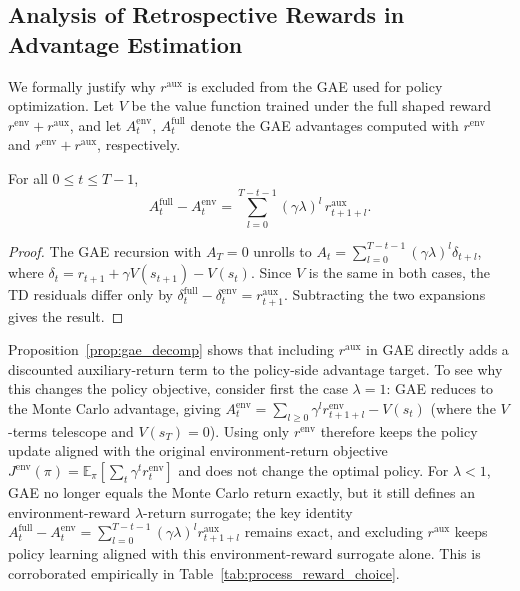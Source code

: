 \subsection{Analysis of Retrospective Rewards in Advantage Estimation}
\label{app:gae_analysis}

We formally justify why $r^{\text{aux}}$ is excluded from the GAE used for policy optimization. Let $V$ be the value function trained under the full shaped reward $r^{\text{env}} + r^{\text{aux}}$, and let $A_t^{\text{env}}$, $A_t^{\text{full}}$ denote the GAE advantages computed with $r^{\text{env}}$ and $r^{\text{env}} + r^{\text{aux}}$, respectively.

\begin{proposition}
\label{prop:gae_decomp}
For all $0 \le t \le T-1$,
\[
A_t^{\text{full}} - A_t^{\text{env}} = \sum_{l=0}^{T-t-1} (\gamma\lambda)^l\, r^{\text{aux}}_{t+1+l}.
\]
\end{proposition}
\begin{proof}
The GAE recursion with $A_T = 0$ unrolls to $A_t = \sum_{l=0}^{T-t-1}(\gamma\lambda)^l \delta_{t+l}$, where $\delta_t = r_{t+1} + \gamma V(s_{t+1}) - V(s_t)$. Since $V$ is the same in both cases, the TD residuals differ only by $\delta_t^{\text{full}} - \delta_t^{\text{env}} = r^{\text{aux}}_{t+1}$. Subtracting the two expansions gives the result.
\end{proof}

Proposition~\ref{prop:gae_decomp} shows that including $r^{\text{aux}}$ in GAE directly adds a discounted auxiliary-return term to the policy-side advantage target. To see why this changes the policy objective, consider first the case $\lambda = 1$: GAE reduces to the Monte Carlo advantage, giving $A_t^{\text{env}} = \sum_{l \geq 0} \gamma^l r^{\text{env}}_{t+1+l} - V(s_t)$ (where the $V$-terms telescope and $V(s_T)=0$). Using only $r^{\text{env}}$ therefore keeps the policy update aligned with the original environment-return objective $J^{\text{env}}(\pi) = \mathbb{E}_\pi[\sum_t \gamma^t r^{\text{env}}_t]$ and does not change the optimal policy. For $\lambda < 1$, GAE no longer equals the Monte Carlo return exactly, but it still defines an environment-reward $\lambda$-return surrogate; the key identity $A_t^{\text{full}} - A_t^{\text{env}} = \sum_{l=0}^{T-t-1}(\gamma\lambda)^l r^{\text{aux}}_{t+1+l}$ remains exact, and excluding $r^{\text{aux}}$ keeps policy learning aligned with this environment-reward surrogate alone. This is corroborated empirically in Table~\ref{tab:process_reward_choice}.



